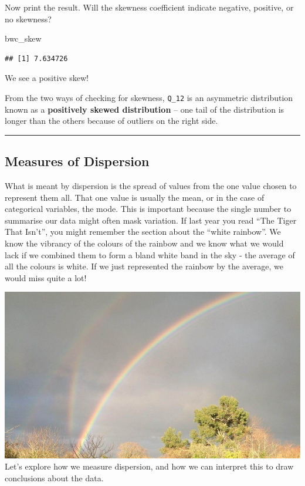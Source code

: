 \documentclass[
]{book}
\newenvironment{Shaded}{\begin{snugshade}}{\end{snugshade}}
\newcommand{\NormalTok}[1]{#1}
\begin{document}
Now print the result. Will the skewness coefficient indicate negative, positive, or no skewness?

\begin{Shaded}
\begin{Highlighting}[]
\NormalTok{bwc\_skew}
\end{Highlighting}
\end{Shaded}

\begin{verbatim}
## [1] 7.634726
\end{verbatim}

We see a positive skew!

From the two ways of checking for skewness, \texttt{Q\_12} is an asymmetric distribution known as a \textbf{positively skewed distribution} -- one tail of the distribution is longer than the others because of outliers on the right side.

\begin{center}\rule{0.5\linewidth}{0.5pt}\end{center}

\hypertarget{measures-of-dispersion}{%
\subsection{Measures of Dispersion}\label{measures-of-dispersion}}

What is meant by dispersion is the spread of values from the one value chosen to represent them all. That one value is usually the mean, or in the case of categorical variables, the mode. This is important because the single number to summarise our data might often mask variation. If last year you read ``The Tiger That Isn't'', you might remember the section about the ``white rainbow''. We know the vibrancy of the colours of the rainbow and we know what we would lack if we combined them to form a bland white band in the sky - the average of all the colours is white. If we just represented the rainbow by the average, we would miss quite a lot!

\includegraphics{Images/rainbow.jpg}
Let's explore how we measure dispersion, and how we can interpret this to draw conclusions about the data.
\end{document}
